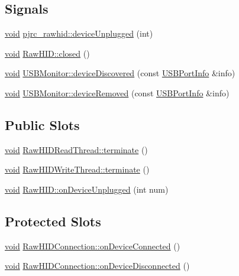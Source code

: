 \subsection*{\-Signals}
\begin{DoxyCompactItemize}
\item 
\hyperlink{group___u_a_v_objects_plugin_ga444cf2ff3f0ecbe028adce838d373f5c}{void} \hyperlink{group___raw_h_i_d_plugin_ga214c3f073c411ac80306d36644715d8c}{pjrc\-\_\-rawhid\-::device\-Unplugged} (int)
\item 
\hyperlink{group___u_a_v_objects_plugin_ga444cf2ff3f0ecbe028adce838d373f5c}{void} \hyperlink{group___raw_h_i_d_plugin_ga4ababcef71544d260177e4957426598c}{\-Raw\-H\-I\-D\-::closed} ()
\item 
\hyperlink{group___u_a_v_objects_plugin_ga444cf2ff3f0ecbe028adce838d373f5c}{void} \hyperlink{group___raw_h_i_d_plugin_gab2f32b160f38299dd97b8bce113ac016}{\-U\-S\-B\-Monitor\-::device\-Discovered} (const \hyperlink{struct_u_s_b_port_info}{\-U\-S\-B\-Port\-Info} \&info)
\item 
\hyperlink{group___u_a_v_objects_plugin_ga444cf2ff3f0ecbe028adce838d373f5c}{void} \hyperlink{group___raw_h_i_d_plugin_ga2184059e85771292590afbb9087ee225}{\-U\-S\-B\-Monitor\-::device\-Removed} (const \hyperlink{struct_u_s_b_port_info}{\-U\-S\-B\-Port\-Info} \&info)
\end{DoxyCompactItemize}
\subsection*{\-Public \-Slots}
\begin{DoxyCompactItemize}
\item 
\hyperlink{group___u_a_v_objects_plugin_ga444cf2ff3f0ecbe028adce838d373f5c}{void} \hyperlink{group___raw_h_i_d_plugin_ga9a2b05a16852317c6f30aa1171b4e605}{\-Raw\-H\-I\-D\-Read\-Thread\-::terminate} ()
\item 
\hyperlink{group___u_a_v_objects_plugin_ga444cf2ff3f0ecbe028adce838d373f5c}{void} \hyperlink{group___raw_h_i_d_plugin_gaf92ea93cbc5d6c7672f8853d3e761122}{\-Raw\-H\-I\-D\-Write\-Thread\-::terminate} ()
\item 
\hyperlink{group___u_a_v_objects_plugin_ga444cf2ff3f0ecbe028adce838d373f5c}{void} \hyperlink{group___raw_h_i_d_plugin_ga62bfd16ef26f8f8e8c52ce836b268c71}{\-Raw\-H\-I\-D\-::on\-Device\-Unplugged} (int num)
\end{DoxyCompactItemize}
\subsection*{\-Protected \-Slots}
\begin{DoxyCompactItemize}
\item 
\hyperlink{group___u_a_v_objects_plugin_ga444cf2ff3f0ecbe028adce838d373f5c}{void} \hyperlink{group___raw_h_i_d_plugin_gae6fbe6bf878bf78034b81d648fd25edb}{\-Raw\-H\-I\-D\-Connection\-::on\-Device\-Connected} ()
\item 
\hyperlink{group___u_a_v_objects_plugin_ga444cf2ff3f0ecbe028adce838d373f5c}{void} \hyperlink{group___raw_h_i_d_plugin_gaf84655a7cf624587cf336b550e8c0045}{\-Raw\-H\-I\-D\-Connection\-::on\-Device\-Disconnected} ()
\end{DoxyCompactItemize}
